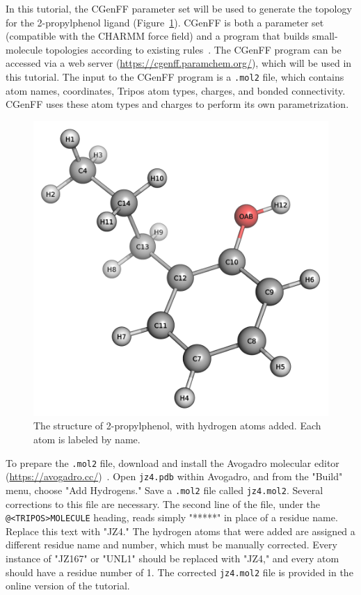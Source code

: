 \documentclass[9pt,tutorial]{livecoms}
\begin{document}
In this tutorial, the CGenFF parameter set will be used to generate the topology for the 2-propylphenol ligand (Figure~\ref{jz4_fig}). CGenFF is both a parameter set (compatible with the CHARMM force field) and a program that builds small-molecule topologies according to existing rules~\cite{Vanommeslaeghe2012a,Vanommeslaeghe2012b}. The CGenFF program can be accessed via a web server (\url{https://cgenff.paramchem.org/}), which will be used in this tutorial. The input to the CGenFF program is a \texttt{.mol2} file, which contains atom names, coordinates, Tripos atom types, charges, and bonded connectivity. CGenFF uses these atom types and charges to perform its own parametrization.

\begin{figure}[h!]
\centering
\includegraphics{jz4}
\caption{The structure of 2-propylphenol, with hydrogen atoms added. Each atom is labeled by name.}
\label{jz4_fig}
\end{figure}

To prepare the \texttt{.mol2} file, download and install the Avogadro molecular editor (\url{https://avogadro.cc/})~\cite{Hanwell2012}. Open \texttt{jz4.pdb} within Avogadro, and from the "Build" menu, choose "Add Hydrogens." Save a \texttt{.mol2} file called \texttt{jz4.mol2}. Several corrections to this file are necessary. The second line of the file, under the \texttt{@<TRIPOS>MOLECULE} heading, reads simply "*****" in place of a residue name. Replace this text with "JZ4." The hydrogen atoms that were added are assigned a different residue name and number, which must be manually corrected. Every instance of "JZ167" or "UNL1" should be replaced with "JZ4," and every atom should have a residue number of 1. The corrected \texttt{jz4.mol2} file is provided in the online version of the tutorial.
\end{document}
